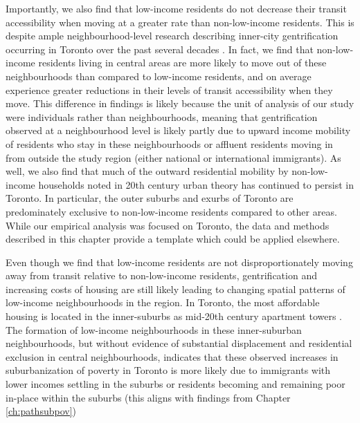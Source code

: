Importantly, we also find that low-income residents do not decrease their transit accessibility when moving at a greater rate than non-low-income residents. This is despite ample neighbourhood-level research describing inner-city gentrification occurring in Toronto over the past several decades \cite{hulchanski_three_2010,walks_gentrification_2021}. In fact, we find that non-low-income residents living in central areas are more likely to move out of these neighbourhoods than compared to low-income residents, and on average experience greater reductions in their levels of transit accessibility when they move. This difference in findings is likely because the unit of analysis of our study were individuals rather than neighbourhoods, meaning that gentrification observed at a neighbourhood level is likely partly due to upward income mobility of residents who stay in these neighbourhoods or affluent residents moving in from outside the study region (either national or international immigrants). As well, we also find that much of the outward residential mobility by non-low-income households noted in 20th century urban theory \cite{burgess_growth_1925,alonso_location_1964} has continued to persist in Toronto. In particular, the outer suburbs and exurbs of Toronto are predominately exclusive to non-low-income residents compared to other areas. While our empirical analysis was focused on Toronto, the data and methods described in this chapter provide a template which could be applied elsewhere. 

Even though we find that low-income residents are not disproportionately moving away from transit relative to non-low-income residents, gentrification and increasing costs of housing are still likely leading to changing spatial patterns of low-income neighbourhoods in the region. In Toronto, the most affordable housing is located in the inner-suburbs as mid-20th century apartment towers \cite{skaburskis_filtering_2014,august_gentrification_2018}. The formation of low-income neighbourhoods in these inner-suburban neighbourhoods, but without evidence of substantial displacement and residential exclusion in central neighbourhoods, indicates that these observed increases in suburbanization of poverty in Toronto is more likely due to immigrants with lower incomes settling in the suburbs or residents becoming and remaining poor in-place within the suburbs (this aligns with findings from Chapter \ref{ch:pathsubpov})



